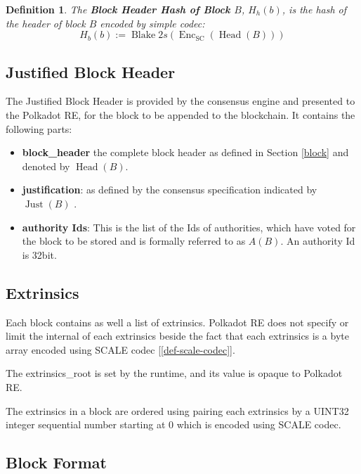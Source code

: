 \documentclass{article}
\newcommand{\assign}{:=}
\newcommand{\tmop}[1]{\ensuremath{\operatorname{#1}}}
\newcommand{\tmsamp}[1]{\textsf{#1}}
\newcommand{\tmstrong}[1]{\textbf{#1}}
\newcommand{\tmtextbf}[1]{{\bfseries{#1}}}
\newcommand{\tmtextsf}[1]{{\sffamily{#1}}}
\newtheorem{definition}{Definition}
\providecommand{\tmop}[1]{\ensuremath{\mathrm{#1}}}
\providecommand{\tmsamp}[1]{\tmtextsf{#1}}
\providecommand{\tmstrong}[1]{\tmtextbf{#1}}
\providecommand{\tmtextbf}[1]{\tmtextbf{#1}}
\newtheorem{definition}{Definition}
\begin{document}
\begin{definition}
  \label{def-block-header-hash}The {\tmstrong{Block Header Hash of Block
  $B$}}, {\tmstrong{$H_h (b)$}}, is the hash of the header of block $B$
  encoded by simple codec:
  \[ H_b (b) \assign \tmop{Blake} 2 s (\tmop{Enc}_{\tmop{SC}} (\tmop{Head}
     (B))) \]
\end{definition}

\subsection{Justified Block Header}

The Justified Block Header is provided by the consensus engine and presented
to the Polkadot RE, for the block to be appended to the blockchain. It
contains the following parts:
\begin{itemize}
  \item {\tmstrong{{\tmsamp{{\tmstrong{block\_header}}}}}} the complete block
  header as defined in Section \ref{block} and denoted by $\tmop{Head} (B)$.
  
  \item {\tmstrong{{\tmsamp{justification}}}}: as defined by the consensus
  specification indicated by $\tmop{Just} (B)$ {}.
  
  \item {\tmstrong{{\tmsamp{authority Ids}}}}: This is the list of the Ids of
  authorities, which have voted for the block to be stored and is formally
  referred to as $A (B)$. An authority Id is 32bit.
\end{itemize}

\subsection{Extrinsics}

Each block contains as well a list of extrinsics. Polkadot RE does not specify
or limit the internal of each extrinsics beside the fact that each extrinsics
is a byte array encoded using SCALE codec [\ref{def-scale-codec}].

The {\tmsamp{extrinsics\_root}} is set by the runtime, and its value is
opaque to Polkadot RE.

The extrinsics in a block are ordered using pairing each extrinsics by a
UINT32 integer sequential number starting at 0 which is encoded using SCALE
codec.

\subsection{Block Format}
\end{document}

